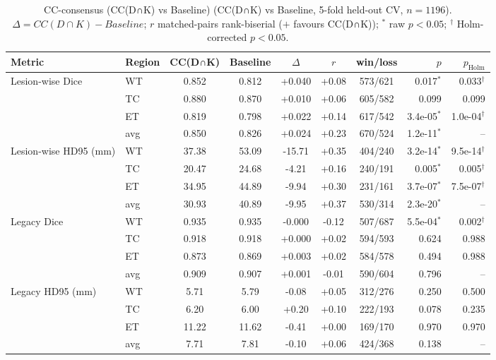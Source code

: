 \begin{table}[t]
\centering
\caption{CC-consensus (CC(D∩K) vs Baseline) (CC(D∩K) vs Baseline, 5-fold held-out CV, $n=1196$). $\Delta=CC(D∩K)-Baseline$; $r$ matched-pairs rank-biserial ($+$ favours CC(D∩K)); $^{*}$ raw $p<0.05$; $^{\dagger}$ Holm-corrected $p<0.05$.}
\label{tab:cc_baseline}
\begin{tabular}{llcccccrr}
\toprule
Metric & Region & CC(D∩K) & Baseline & $\Delta$ & $r$ & win/loss & $p$ & $p_{\mathrm{Holm}}$ \\
\midrule
\multirow{4}{*}{Lesion-wise Dice} & WT & 0.852 & 0.812 & +0.040 & +0.08 & 573/621 & 0.017$^{*}$ & 0.033$^{\dagger}$ \\
 & TC & 0.880 & 0.870 & +0.010 & +0.06 & 605/582 & 0.099 & 0.099 \\
 & ET & 0.819 & 0.798 & +0.022 & +0.14 & 617/542 & 3.4e-05$^{*}$ & 1.0e-04$^{\dagger}$ \\
 & avg & 0.850 & 0.826 & +0.024 & +0.23 & 670/524 & 1.2e-11$^{*}$ & -- \\
\midrule
\multirow{4}{*}{Lesion-wise HD95 (mm)} & WT & 37.38 & 53.09 & -15.71 & +0.35 & 404/240 & 3.2e-14$^{*}$ & 9.5e-14$^{\dagger}$ \\
 & TC & 20.47 & 24.68 & -4.21 & +0.16 & 240/191 & 0.005$^{*}$ & 0.005$^{\dagger}$ \\
 & ET & 34.95 & 44.89 & -9.94 & +0.30 & 231/161 & 3.7e-07$^{*}$ & 7.5e-07$^{\dagger}$ \\
 & avg & 30.93 & 40.89 & -9.95 & +0.37 & 530/314 & 2.3e-20$^{*}$ & -- \\
\midrule
\multirow{4}{*}{Legacy Dice} & WT & 0.935 & 0.935 & -0.000 & -0.12 & 507/687 & 5.5e-04$^{*}$ & 0.002$^{\dagger}$ \\
 & TC & 0.918 & 0.918 & +0.000 & +0.02 & 594/593 & 0.624 & 0.988 \\
 & ET & 0.873 & 0.869 & +0.003 & +0.02 & 584/578 & 0.494 & 0.988 \\
 & avg & 0.909 & 0.907 & +0.001 & -0.01 & 590/604 & 0.796 & -- \\
\midrule
\multirow{4}{*}{Legacy HD95 (mm)} & WT & 5.71 & 5.79 & -0.08 & +0.05 & 312/276 & 0.250 & 0.500 \\
 & TC & 6.20 & 6.00 & +0.20 & +0.10 & 222/193 & 0.078 & 0.235 \\
 & ET & 11.22 & 11.62 & -0.41 & +0.00 & 169/170 & 0.970 & 0.970 \\
 & avg & 7.71 & 7.81 & -0.10 & +0.06 & 424/368 & 0.138 & -- \\
\midrule
\bottomrule
\end{tabular}
\end{table}

